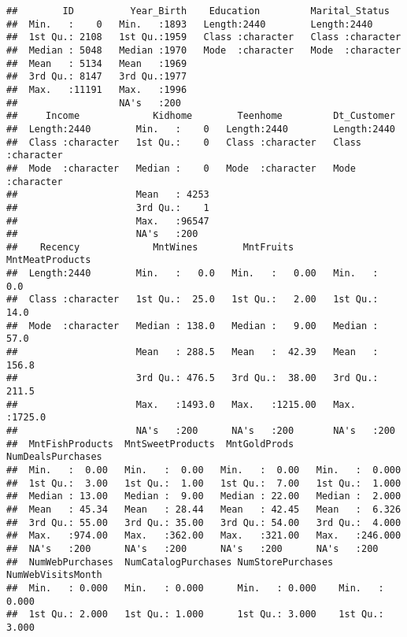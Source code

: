 \documentclass[
]{article}
\begin{document}
\begin{verbatim}
##        ID          Year_Birth    Education         Marital_Status    
##  Min.   :    0   Min.   :1893   Length:2440        Length:2440       
##  1st Qu.: 2108   1st Qu.:1959   Class :character   Class :character  
##  Median : 5048   Median :1970   Mode  :character   Mode  :character  
##  Mean   : 5134   Mean   :1969                                        
##  3rd Qu.: 8147   3rd Qu.:1977                                        
##  Max.   :11191   Max.   :1996                                        
##                  NA's   :200                                         
##     Income             Kidhome        Teenhome         Dt_Customer       
##  Length:2440        Min.   :    0   Length:2440        Length:2440       
##  Class :character   1st Qu.:    0   Class :character   Class :character  
##  Mode  :character   Median :    0   Mode  :character   Mode  :character  
##                     Mean   : 4253                                        
##                     3rd Qu.:    1                                        
##                     Max.   :96547                                        
##                     NA's   :200                                          
##    Recency             MntWines        MntFruits       MntMeatProducts 
##  Length:2440        Min.   :   0.0   Min.   :   0.00   Min.   :   0.0  
##  Class :character   1st Qu.:  25.0   1st Qu.:   2.00   1st Qu.:  14.0  
##  Mode  :character   Median : 138.0   Median :   9.00   Median :  57.0  
##                     Mean   : 288.5   Mean   :  42.39   Mean   : 156.8  
##                     3rd Qu.: 476.5   3rd Qu.:  38.00   3rd Qu.: 211.5  
##                     Max.   :1493.0   Max.   :1215.00   Max.   :1725.0  
##                     NA's   :200      NA's   :200       NA's   :200     
##  MntFishProducts  MntSweetProducts  MntGoldProds    NumDealsPurchases
##  Min.   :  0.00   Min.   :  0.00   Min.   :  0.00   Min.   :  0.000  
##  1st Qu.:  3.00   1st Qu.:  1.00   1st Qu.:  7.00   1st Qu.:  1.000  
##  Median : 13.00   Median :  9.00   Median : 22.00   Median :  2.000  
##  Mean   : 45.34   Mean   : 28.44   Mean   : 42.45   Mean   :  6.326  
##  3rd Qu.: 55.00   3rd Qu.: 35.00   3rd Qu.: 54.00   3rd Qu.:  4.000  
##  Max.   :974.00   Max.   :362.00   Max.   :321.00   Max.   :246.000  
##  NA's   :200      NA's   :200      NA's   :200      NA's   :200      
##  NumWebPurchases  NumCatalogPurchases NumStorePurchases NumWebVisitsMonth
##  Min.   : 0.000   Min.   : 0.000      Min.   : 0.000    Min.   : 0.000   
##  1st Qu.: 2.000   1st Qu.: 1.000      1st Qu.: 3.000    1st Qu.: 3.000   

\end{verbatim}
\end{document}
